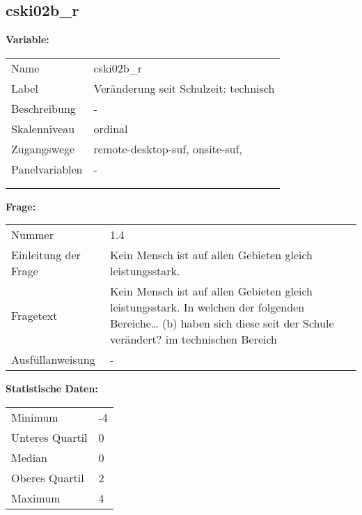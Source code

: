 	
	
	\subsection{cski02b\_r}
	\label{subSection:cski02b_r}

	\noindent\textbf{Variable:}\\
		\begin{tabular}{lL{11.3cm}}
			\label{tableVariable:cski02b_r}
			Name & cski02b\_r \\
			Label & Veränderung seit Schulzeit: technisch \\
			Beschreibung & - \\
			Skalenniveau & ordinal \\
			Zugangswege &
				remote-desktop-suf,
				onsite-suf,
 \\
			Panelvariablen & -
			 \\
			 \\
 \\
		\end{tabular}

		\vspace*{1 cm}
		\noindent\textbf{Frage:}\\
		\begin{tabular}{lL{11.3cm}}
			\label{tableQuestion:cski02b_r}
			Nummer & 1.4 \\
			Einleitung der Frage & Kein Mensch ist auf allen Gebieten gleich leistungsstark. \\
			Fragetext & Kein Mensch ist auf allen Gebieten gleich leistungsstark. In welchen der folgenden Bereiche…
(b) haben sich diese seit der Schule verändert?
im technischen Bereich \\
			Ausfüllanweisung & - \\
		\end{tabular}


		\vspace*{1 cm}
		\noindent\textbf{Statistische Daten:}\\
			\begin{tabular}{ll}
				\label{tableStatistics:cski02b_r}
					Minimum & -4 \\
					Unteres Quartil & 0 \\
					Median & 0 \\
					Oberes Quartil & 2 \\
					Maximum & 4 \\
			\end{tabular}



